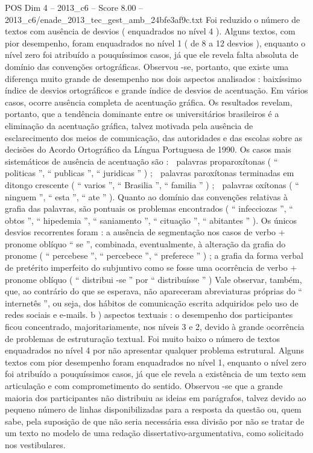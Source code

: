 \begin{textsample}{POS Dim 4 – 2013\_c6 – Score 8.00 – 2013\_c6/enade\_2013\_tec\_gest\_amb\_24bfe3af9c.txt}
Foi reduzido o número de textos com ausência de desvios ( enquadrados no nível 4 ).
Alguns textos, com pior desempenho, foram enquadrados no nível 1 ( de 8 a 12 desvios ), enquanto o nível zero foi atribuído a pouquíssimos casos, já que ele revela falta absoluta de domínio das convenções ortográficas.
Observou -se, portanto, que existe uma diferença muito grande de desempenho nos dois aspectos analisados : baixíssimo índice de desvios ortográficos e grande índice de desvios de acentuação.
Em vários casos, ocorre ausência completa de acentuação gráfica.
Os resultados revelam, portanto, que a tendência dominante entre os universitários brasileiros é a eliminação da acentuação gráfica, talvez motivada pela ausência de esclarecimento dos meios de comunicação, das autoridades e das escolas sobre as decisões do Acordo Ortográfico da Língua Portuguesa de 1990.
Os casos mais sistemáticos de ausência de acentuação são :  palavras proparoxítonas ( “ politicas ”, “ publicas ”, “ juridicas ” ) ;  palavras paroxítonas terminadas em ditongo crescente ( “ varios ”, “ Brasilia ”, “ familia ” ) ;  palavras oxítonas ( “ ninguem ”, “ esta ”, “ ate ” ).
Quanto ao domínio das convenções relativas à grafia das palavras, são pontuais os problemas encontrados ( “ infecciozas ”, “ obtos ”, “ hipedemia ”, “ saniamento ”, “ cituação ”, “ abitantes ” ).
Os únicos desvios recorrentes foram : a ausência de segmentação nos casos de verbo + pronome oblíquo “ se ”, combinada, eventualmente, à alteração da grafia do pronome ( “ percebese ”, “ percebece ”, “ preferece ” ) ; a grafia da forma verbal de pretérito imperfeito do subjuntivo como se fosse uma ocorrência de verbo + pronome oblíquo ( “ distribui -se ” por “ distribuísse ” ) Vale observar, também, que, ao contrário do que se esperava, não apareceram abreviaturas próprias do “ internetês ”, ou seja, dos hábitos de comunicação escrita adquiridos pelo uso de redes sociais e e-mails. b ) aspectos textuais : o desempenho dos participantes ficou concentrado, majoritariamente, nos níveis 3 e 2, devido à grande ocorrência de problemas de estruturação textual.
Foi muito baixo o número de textos enquadrados no nível 4 por não apresentar qualquer problema estrutural.
Alguns textos com pior desempenho foram enquadrados no nível 1, enquanto o nível zero foi atribuído a pouquíssimos casos, já que ele revela a existência de um texto sem articulação e com comprometimento do sentido.
Observou -se que a grande maioria dos participantes não distribuiu as ideias em parágrafos, talvez devido ao pequeno número de linhas disponibilizadas para a resposta da questão ou, quem sabe, pela suposição de que não seria necessária essa divisão por não se tratar de um texto no modelo de uma redação dissertativo-argumentativa, como solicitado nos vestibulares.

\end{textsample}
